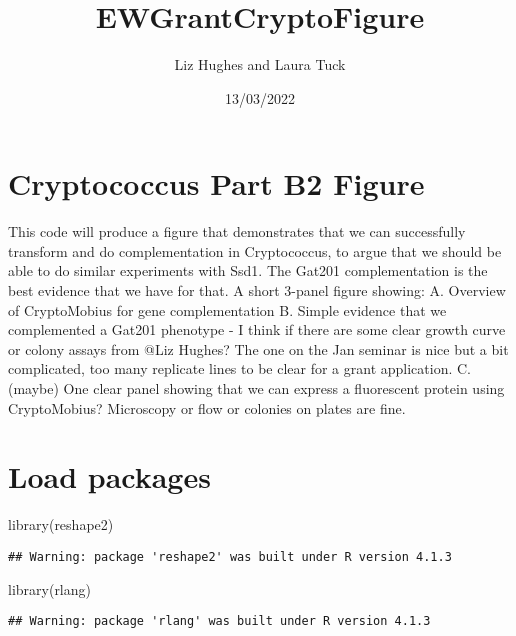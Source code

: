 \documentclass[
]{article}
\title{EWGrantCryptoFigure}
\author{Liz Hughes and Laura Tuck}
\date{13/03/2022}
\newenvironment{Shaded}{\begin{snugshade}}{\end{snugshade}}
\newcommand{\FunctionTok}[1]{\textcolor[rgb]{0.00,0.00,0.00}{#1}}
\newcommand{\NormalTok}[1]{#1}
\begin{document}
\maketitle

{
\setcounter{tocdepth}{2}
\tableofcontents
}
\hypertarget{cryptococcus-part-b2-figure}{%
\section{Cryptococcus Part B2
Figure}\label{cryptococcus-part-b2-figure}}

This code will produce a figure that demonstrates that we can
successfully transform and do complementation in Cryptococcus, to argue
that we should be able to do similar experiments with Ssd1. The Gat201
complementation is the best evidence that we have for that. A short
3-panel figure showing: A. Overview of CryptoMobius for gene
complementation B. Simple evidence that we complemented a Gat201
phenotype - I think if there are some clear growth curve or colony
assays from @Liz Hughes? The one on the Jan seminar is nice but a bit
complicated, too many replicate lines to be clear for a grant
application. C. (maybe) One clear panel showing that we can express a
fluorescent protein using CryptoMobius? Microscopy or flow or colonies
on plates are fine.

\hypertarget{load-packages}{%
\section{Load packages}\label{load-packages}}

\begin{Shaded}
\begin{Highlighting}[]
\FunctionTok{library}\NormalTok{(reshape2)}
\end{Highlighting}
\end{Shaded}

\begin{verbatim}
## Warning: package 'reshape2' was built under R version 4.1.3
\end{verbatim}

\begin{Shaded}
\begin{Highlighting}[]
\FunctionTok{library}\NormalTok{(rlang)}
\end{Highlighting}
\end{Shaded}

\begin{verbatim}
## Warning: package 'rlang' was built under R version 4.1.3
\end{verbatim}
\end{document}
